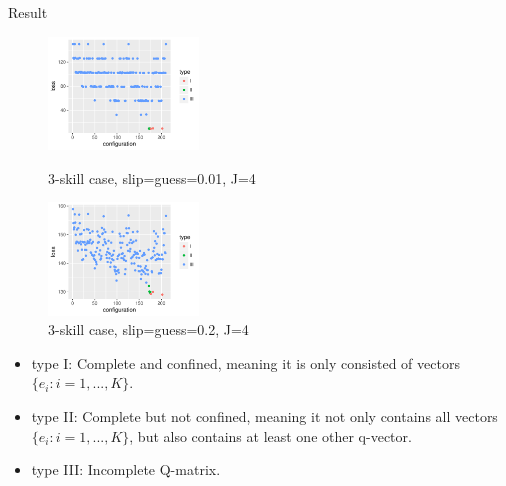\documentclass[handout]{beamer}
\begin{document}
\begin{frame}{Result}
	\begin{figure}
		\begin{minipage}[b]{0.45\linewidth}
			\centering
			\includegraphics[width=4cm, height=3cm]{Figures/LossBestConfig_theta001_J4.pdf}
			\caption{3-skill case, slip=guess=0.01, J=4}
			\label{fig:Config-1}
		\end{minipage}
		\hfill
	    \begin{minipage}[b]{0.45\linewidth}
	    	\centering
			\includegraphics[width=4cm, height=3cm]{Figures/LossBestConfig_theta02_J4.pdf}
			\caption{3-skill case, slip=guess=0.2, J=4}
			\label{fig:Config-2}
	    \end{minipage}
	\end{figure}
\begin{itemize}
\item type I: Complete and confined, meaning it is only consisted of vectors $\{e_{i}:i=1,...,K\}$.
\item type II: Complete but not confined, meaning it not only contains all vectors $\{e_{i}:i=1,...,K\}$, but also contains at least one other q-vector.
\item type III: Incomplete Q-matrix.
\end{itemize}
\end{frame}
\end{document}
